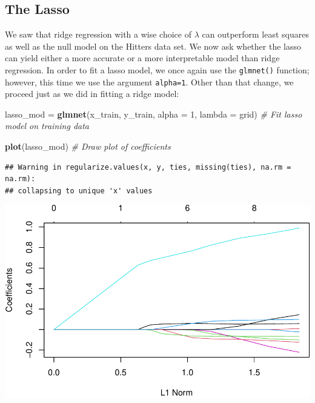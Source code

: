 \documentclass[]{article}
\newenvironment{Shaded}{\begin{snugshade}}{\end{snugshade}}
\newcommand{\KeywordTok}[1]{\textcolor[rgb]{0.13,0.29,0.53}{\textbf{#1}}}
\newcommand{\DataTypeTok}[1]{\textcolor[rgb]{0.13,0.29,0.53}{#1}}
\newcommand{\DecValTok}[1]{\textcolor[rgb]{0.00,0.00,0.81}{#1}}
\newcommand{\StringTok}[1]{\textcolor[rgb]{0.31,0.60,0.02}{#1}}
\newcommand{\CommentTok}[1]{\textcolor[rgb]{0.56,0.35,0.01}{\textit{#1}}}
\newcommand{\NormalTok}[1]{#1}
\begin{document}
\subsection{The Lasso}\label{the-lasso}

We saw that ridge regression with a wise choice of \(\lambda\) can
outperform least squares as well as the null model on the Hitters data
set. We now ask whether the lasso can yield either a more accurate or a
more interpretable model than ridge regression. In order to fit a lasso
model, we once again use the \texttt{glmnet()} function; however, this
time we use the argument \texttt{alpha=1}. Other than that change, we
proceed just as we did in fitting a ridge model:

\begin{Shaded}
\begin{Highlighting}[]
\NormalTok{lasso_mod =}\StringTok{ }\KeywordTok{glmnet}\NormalTok{(x_train, }
\NormalTok{                   y_train, }
                   \DataTypeTok{alpha =} \DecValTok{1}\NormalTok{, }
                   \DataTypeTok{lambda =}\NormalTok{ grid) }\CommentTok{# Fit lasso model on training data}

\KeywordTok{plot}\NormalTok{(lasso_mod)    }\CommentTok{# Draw plot of coefficients}
\end{Highlighting}
\end{Shaded}

\begin{verbatim}
## Warning in regularize.values(x, y, ties, missing(ties), na.rm = na.rm):
## collapsing to unique 'x' values
\end{verbatim}

\includegraphics{BodyFat_files/figure-latex/unnamed-chunk-37-1.pdf}
\end{document}
